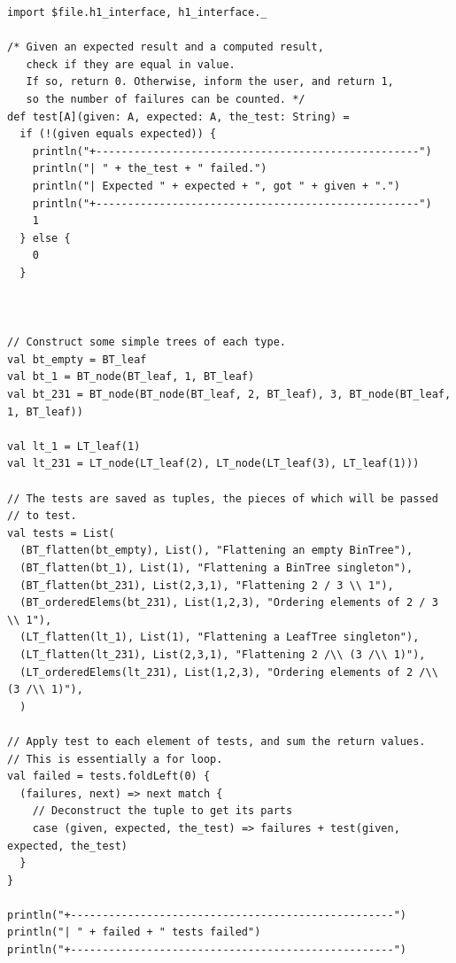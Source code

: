 \documentclass[11pt]{article}
\begin{document}
\begin{verbatim}
import $file.h1_interface, h1_interface._

/* Given an expected result and a computed result,
   check if they are equal in value.
   If so, return 0. Otherwise, inform the user, and return 1,
   so the number of failures can be counted. */
def test[A](given: A, expected: A, the_test: String) =
  if (!(given equals expected)) {
    println("+---------------------------------------------------")
    println("| " + the_test + " failed.")
    println("| Expected " + expected + ", got " + given + ".")
    println("+---------------------------------------------------")
    1
  } else {
    0
  }



// Construct some simple trees of each type.
val bt_empty = BT_leaf
val bt_1 = BT_node(BT_leaf, 1, BT_leaf)
val bt_231 = BT_node(BT_node(BT_leaf, 2, BT_leaf), 3, BT_node(BT_leaf, 1, BT_leaf))

val lt_1 = LT_leaf(1)
val lt_231 = LT_node(LT_leaf(2), LT_node(LT_leaf(3), LT_leaf(1)))

// The tests are saved as tuples, the pieces of which will be passed
// to test.
val tests = List(
  (BT_flatten(bt_empty), List(), "Flattening an empty BinTree"),
  (BT_flatten(bt_1), List(1), "Flattening a BinTree singleton"),
  (BT_flatten(bt_231), List(2,3,1), "Flattening 2 / 3 \\ 1"),
  (BT_orderedElems(bt_231), List(1,2,3), "Ordering elements of 2 / 3 \\ 1"),
  (LT_flatten(lt_1), List(1), "Flattening a LeafTree singleton"),
  (LT_flatten(lt_231), List(2,3,1), "Flattening 2 /\\ (3 /\\ 1)"),
  (LT_orderedElems(lt_231), List(1,2,3), "Ordering elements of 2 /\\ (3 /\\ 1)"),
  )

// Apply test to each element of tests, and sum the return values.
// This is essentially a for loop.
val failed = tests.foldLeft(0) {
  (failures, next) => next match {
    // Deconstruct the tuple to get its parts
    case (given, expected, the_test) => failures + test(given, expected, the_test)
  }
}

println("+---------------------------------------------------")
println("| " + failed + " tests failed")
println("+---------------------------------------------------")
\end{verbatim}
\end{document}
